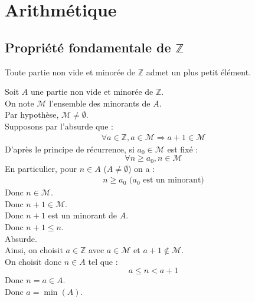 \documentclass[../main.tex]{subfiles}
\begin{document}
\setcounter{chapter}{11}
\chapter{Arithmétique}
\tableofcontents
\clearpage

\section{Propriété fondamentale de $\mathbb{Z}$}
\begin{tcolorbox}[title=Théorème 12.1, title filled=false, colframe=orange, colback=orange!10!white]
    Toute partie non vide et minorée de $\mathbb{Z}$ admet un plus petit élément. 
\end{tcolorbox}

Soit $A$ une partie non vide et minorée de $\mathbb{Z}$. \\
On note $\mathcal{M}$ l'ensemble des minorants de $A$. \\
Par hypothèse, $\mathcal{M} \neq \emptyset$. \\
Supposons par l'absurde que : 
\begin{align*}
    \forall a \in \mathbb{Z}, a \in \mathcal{M} \Rightarrow a + 1 \in \mathcal{M}
\end{align*}
D'après le principe de récurrence, si $a_0 \in \mathcal{M}$ est fixé : 
$$\forall n \geq a_0, n \in \mathcal{M}$$
En particulier, pour $n \in A$ ($A \neq \emptyset$) on a : 
\begin{align*}
    n \geq a_0 \text{ ($a_0$ est un minorant)}
\end{align*}
Donc $n \in \mathcal{M}$. \\
Donc $n + 1 \in \mathcal{M}$. \\
Donc $n + 1$ est un minorant de $A$. \\
Donc $n + 1 \leq n$. \\
Absurde. \\
Ainsi, on choisit $a \in \mathbb{Z}$ avec $a \in \mathcal{M}$ et $a + 1 \not \in \mathcal{M}$. \\
On choisit donc $n \in A$ tel que : 
$$a \leq n < a + 1$$
Donc $n = a \in A$. \\
Donc $a = \min(A)$.

\setcounter{section}{3}
\end{document}
